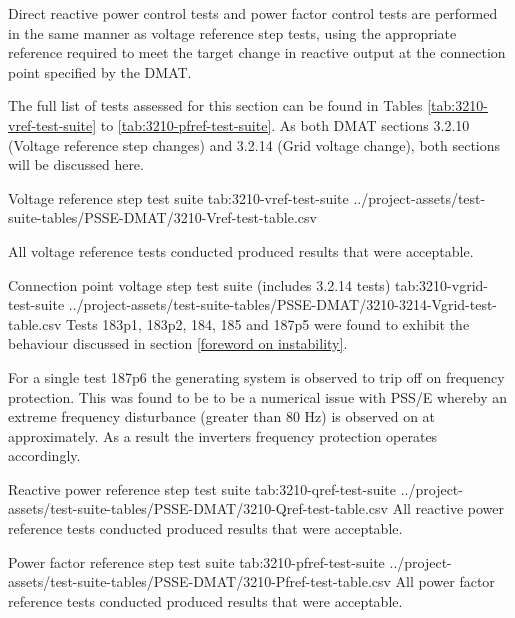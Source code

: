 \documentclass{../grid-link-report}
\newcommand{\projectassetsdir}{../project-assets}
\begin{document}
	
	
	
	Direct reactive power control tests and power factor control tests are performed in the same manner as voltage reference step tests, using the appropriate reference required to meet the target change in reactive output at the connection point specified by the \ac{DMAT}.
	
	The full list of tests assessed for this section can be found in Tables \ref{tab:3210-vref-test-suite} to \ref{tab:3210-pfref-test-suite}. As both DMAT sections 3.2.10 (Voltage reference step changes) and 3.2.14 (Grid voltage change), both sections will be discussed here.
	
	{
		\fontsize{7}{9}\selectfont
		\autoscaledlongtable
		{Voltage reference step test suite}
		{tab:3210-vref-test-suite}
		{\projectassetsdir/test-suite-tables/PSSE-DMAT/3210-Vref-test-table.csv}
	}
	
	All voltage reference tests conducted produced results that were acceptable.
	
	{
		\fontsize{7}{9}\selectfont
		\autoscaledlongtable
		{Connection point voltage step test suite (includes 3.2.14 tests)}
		{tab:3210-vgrid-test-suite}
		{\projectassetsdir/test-suite-tables/PSSE-DMAT/3210-3214-Vgrid-test-table.csv}
	}
	Tests 183p1, 183p2, 184, 185 and 187p5 were found to exhibit the behaviour discussed in section \ref{foreword on instability}.
	
	For a single test 187p6 the generating system is observed to trip off on frequency protection. This was found to be to be a numerical issue with PSS/E whereby an extreme frequency disturbance (greater than 80 Hz) is observed on at approximately. As a result the inverters frequency protection operates accordingly.
	
	
	{
		\fontsize{7}{9}\selectfont
		\autoscaledlongtable
		{Reactive power reference step test suite}
		{tab:3210-qref-test-suite}
		{\projectassetsdir/test-suite-tables/PSSE-DMAT/3210-Qref-test-table.csv}
	}
	All reactive power reference tests conducted produced results that were acceptable.
	
	{
		\fontsize{7}{9}\selectfont
		\autoscaledlongtable
		{Power factor reference step test suite}
		{tab:3210-pfref-test-suite}
		{\projectassetsdir/test-suite-tables/PSSE-DMAT/3210-Pfref-test-table.csv}
	}
	All power factor reference tests conducted produced results that were acceptable.
	
\end{document}
